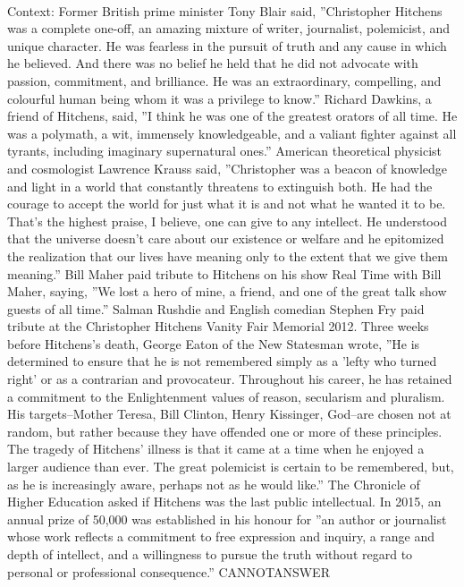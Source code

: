 \documentclass[11pt,a4paper, onecolumn]{article}
\begin{document}
\\ Context: Former British prime minister Tony Blair said, ''Christopher Hitchens was a complete one-off, an amazing mixture of writer, journalist, polemicist, and unique character. He was fearless in the pursuit of truth and any cause in which he believed. And there was no belief he held that he did not advocate with passion, commitment, and brilliance. He was an extraordinary, compelling, and colourful human being whom it was a privilege to know.'' Richard Dawkins, a friend of Hitchens, said, ''I think he was one of the greatest orators of all time. He was a polymath, a wit, immensely knowledgeable, and a valiant fighter against all tyrants, including imaginary supernatural ones.'' American theoretical physicist and cosmologist Lawrence Krauss said, ''Christopher was a beacon of knowledge and light in a world that constantly threatens to extinguish both. He had the courage to accept the world for just what it is and not what he wanted it to be. That's the highest praise, I believe, one can give to any intellect. He understood that the universe doesn't care about our existence or welfare and he epitomized the realization that our lives have meaning only to the extent that we give them meaning.'' Bill Maher paid tribute to Hitchens on his show Real Time with Bill Maher, saying, ''We lost a hero of mine, a friend, and one of the great talk show guests of all time.'' Salman Rushdie and English comedian Stephen Fry paid tribute at the Christopher Hitchens Vanity Fair Memorial 2012. Three weeks before Hitchens's death, George Eaton of the New Statesman wrote, ''He is determined to ensure that he is not remembered simply as a 'lefty who turned right' or as a contrarian and provocateur. Throughout his career, he has retained a commitment to the Enlightenment values of reason, secularism and pluralism. His targets--Mother Teresa, Bill Clinton, Henry Kissinger, God--are chosen not at random, but rather because they have offended one or more of these principles. The tragedy of Hitchens' illness is that it came at a time when he enjoyed a larger audience than ever. The great polemicist is certain to be remembered, but, as he is increasingly aware, perhaps not as he would like.'' The Chronicle of Higher Education asked if Hitchens was the last public intellectual. In 2015, an annual prize of  50,000 was established in his honour for ''an author or journalist whose work reflects a commitment to free expression and inquiry, a range and depth of intellect, and a willingness to pursue the truth without regard to personal or professional consequence.'' CANNOTANSWER
\end{document}
